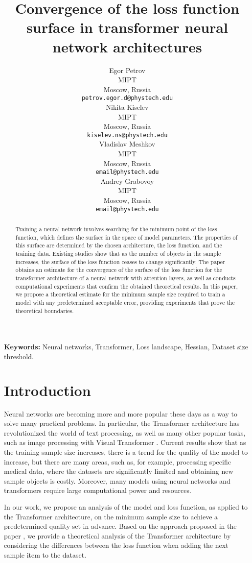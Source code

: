 \documentclass{article}
\title{Convergence of the loss function surface in transformer neural network architectures}
\author{
  Egor Petrov\\
  MIPT\\
  Moscow, Russia\\
  \texttt{petrov.egor.d@phystech.edu}\\
  \And
  Nikita Kiselev\\
  MIPT\\
  Moscow, Russia\\
  \texttt{kiselev.ns@phystech.edu}\\
  \And
  Vladislav Meshkov\\
  MIPT\\
  Moscow, Russia\\
  \texttt{email@phystech.edu}\\
  \And
  Andrey Grabovoy\\
  MIPT\\
  Moscow, Russia\\
  \texttt{email@phystech.edu}\\
}
\begin{document}
\maketitle

\begin{abstract}
    Training a neural network involves searching for the minimum point of the loss function, which defines the surface in the space of model parameters. 
    The properties of this surface are determined by the chosen architecture, the loss function, and the training data. 
    Existing studies show that as the number of objects in the sample increases, the surface of the loss function ceases to change significantly. 
    The paper obtains an estimate for the convergence of the surface of the loss function for the transformer architecture of a neural network with attention layers, as well as conducts computational experiments that confirm the obtained theoretical results. 
    In this paper, we propose a theoretical estimate for the minimum sample size required to train a model with any predetermined acceptable error, providing experiments that prove the theoretical boundaries.
\end{abstract}

\textbf{Keywords:} Neural networks, Transformer, Loss landscape, Hessian, Dataset size threshold.

\section{Introduction}\label{sec:intro}

Neural networks are becoming more and more popular these days as a way to solve many practical problems. In particular, the Transformer \cite{vaswani2017attention} architecture has revolutionized the world of text processing, as well as many other popular tasks, such as image processing with Visual Transformer \cite{wu2020visualtransformer}. Current results show that as the training sample size increases, there is a trend for the quality of the \cite{kaplan2020scaling} model to increase, but there are many areas, such as, for example, processing specific medical data, where the datasets are significantly limited \cite{moreno2024medicalfewshot} and obtaining new sample objects is costly. Moreover, many models using neural networks and transformers require large computational power and resources. 

In our work, we propose an analysis of the model and loss function, as applied to the Transformer architecture, on the minimum sample size to achieve a predetermined quality set in advance. Based on the approach proposed in the paper \cite{kiselev2024unraveling}, we provide a theoretical analysis of the Transformer architecture by considering the differences between the loss function when adding the next sample item to the dataset. 
\end{document}
